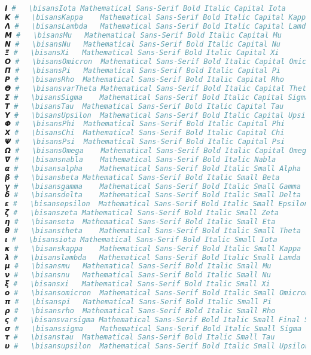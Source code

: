 \begin{lstlisting}[language=Julia, style=julia]
𝞘 #   \bisansIota Mathematical Sans-Serif Bold Italic Capital Iota
𝞙 #   \bisansKappa    Mathematical Sans-Serif Bold Italic Capital Kappa
𝞚 #   \bisansLambda   Mathematical Sans-Serif Bold Italic Capital Lamda
𝞛 #   \bisansMu   Mathematical Sans-Serif Bold Italic Capital Mu
𝞜 #   \bisansNu   Mathematical Sans-Serif Bold Italic Capital Nu
𝞝 #   \bisansXi   Mathematical Sans-Serif Bold Italic Capital Xi
𝞞 #   \bisansOmicron  Mathematical Sans-Serif Bold Italic Capital Omicron
𝞟 #   \bisansPi   Mathematical Sans-Serif Bold Italic Capital Pi
𝞠 #   \bisansRho  Mathematical Sans-Serif Bold Italic Capital Rho
𝞡 #   \bisansvarTheta Mathematical Sans-Serif Bold Italic Capital Theta Symbol
𝞢 #   \bisansSigma    Mathematical Sans-Serif Bold Italic Capital Sigma
𝞣 #   \bisansTau  Mathematical Sans-Serif Bold Italic Capital Tau
𝞤 #   \bisansUpsilon  Mathematical Sans-Serif Bold Italic Capital Upsilon
𝞥 #   \bisansPhi  Mathematical Sans-Serif Bold Italic Capital Phi
𝞦 #   \bisansChi  Mathematical Sans-Serif Bold Italic Capital Chi
𝞧 #   \bisansPsi  Mathematical Sans-Serif Bold Italic Capital Psi
𝞨 #   \bisansOmega    Mathematical Sans-Serif Bold Italic Capital Omega
𝞩 #   \bisansnabla    Mathematical Sans-Serif Bold Italic Nabla
𝞪 #   \bisansalpha    Mathematical Sans-Serif Bold Italic Small Alpha
𝞫 #   \bisansbeta Mathematical Sans-Serif Bold Italic Small Beta
𝞬 #   \bisansgamma    Mathematical Sans-Serif Bold Italic Small Gamma
𝞭 #   \bisansdelta    Mathematical Sans-Serif Bold Italic Small Delta
𝞮 #   \bisansepsilon  Mathematical Sans-Serif Bold Italic Small Epsilon
𝞯 #   \bisanszeta Mathematical Sans-Serif Bold Italic Small Zeta
𝞰 #   \bisanseta  Mathematical Sans-Serif Bold Italic Small Eta
𝞱 #   \bisanstheta    Mathematical Sans-Serif Bold Italic Small Theta
𝞲 #   \bisansiota Mathematical Sans-Serif Bold Italic Small Iota
𝞳 #   \bisanskappa    Mathematical Sans-Serif Bold Italic Small Kappa
𝞴 #   \bisanslambda   Mathematical Sans-Serif Bold Italic Small Lamda
𝞵 #   \bisansmu   Mathematical Sans-Serif Bold Italic Small Mu
𝞶 #   \bisansnu   Mathematical Sans-Serif Bold Italic Small Nu
𝞷 #   \bisansxi   Mathematical Sans-Serif Bold Italic Small Xi
𝞸 #   \bisansomicron  Mathematical Sans-Serif Bold Italic Small Omicron
𝞹 #   \bisanspi   Mathematical Sans-Serif Bold Italic Small Pi
𝞺 #   \bisansrho  Mathematical Sans-Serif Bold Italic Small Rho
𝞻 #   \bisansvarsigma Mathematical Sans-Serif Bold Italic Small Final Sigma
𝞼 #   \bisanssigma    Mathematical Sans-Serif Bold Italic Small Sigma
𝞽 #   \bisanstau  Mathematical Sans-Serif Bold Italic Small Tau
𝞾 #   \bisansupsilon  Mathematical Sans-Serif Bold Italic Small Upsilon

\end{lstlisting}
